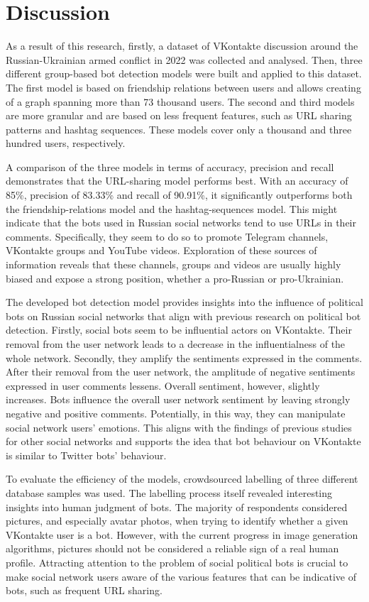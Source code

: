 \chapter{Discussion}
\label{ch:discussion}

As a result of this research, firstly, a dataset of VKontakte discussion around the Russian-Ukrainian armed conflict in 2022 was collected and analysed. Then, three different group-based bot detection models were built and applied to this dataset. The first model is based on friendship relations between users and allows creating of a graph spanning more than 73 thousand users. The second and third models are more granular and are based on less frequent features, such as URL sharing patterns and hashtag sequences. These models cover only a thousand and three hundred users, respectively.

A comparison of the three models in terms of accuracy, precision and recall demonstrates that the URL-sharing model performs best. With an accuracy of 85\%, precision of 83.33\% and recall of 90.91\%, it significantly outperforms both the friendship-relations model and the hashtag-sequences model. This might indicate that the bots used in Russian social networks tend to use URLs in their comments. Specifically, they seem to do so to promote Telegram channels, VKontakte groups and YouTube videos. Exploration of these sources of information reveals that these channels, groups and videos are usually highly biased and expose a strong position, whether a pro-Russian or pro-Ukrainian.  

The developed bot detection model provides insights into the influence of political bots on Russian social networks that align with previous research on political bot detection. Firstly, social bots seem to be influential actors on VKontakte. Their removal from the user network leads to a decrease in the influentialness of the whole network. Secondly, they amplify the sentiments expressed in the comments. After their removal from the user network, the amplitude of negative sentiments expressed in user comments lessens. Overall sentiment, however, slightly increases. Bots influence the overall user network sentiment by leaving strongly negative and positive comments. Potentially, in this way, they can manipulate social network users' emotions. This aligns with the findings of previous studies for other social networks and supports the idea that bot behaviour on VKontakte is similar to Twitter bots' behaviour. 

To evaluate the efficiency of the models, crowdsourced labelling of three different database samples was used. The labelling process itself revealed interesting insights into human judgment of bots. The majority of respondents considered pictures, and especially avatar photos, when trying to identify whether a given VKontakte user is a bot. However, with the current progress in image generation algorithms, pictures should not be considered a reliable sign of a real human profile. Attracting attention to the problem of social political bots is crucial to make social network users aware of the various features that can be indicative of bots, such as frequent URL sharing. 

